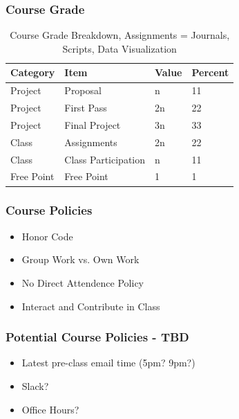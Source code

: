 \documentclass[14pt]{beamer}
\begin{document}
\begin{frame}
\frametitle{Course Grade}
\begin{table}
\begin{tabular}{l l l l}
\toprule
\textbf{Category} & \textbf{Item} & \textbf{Value} & \textbf{Percent}\\
\midrule
Project & Proposal & n & 11 \\
Project & First Pass & 2n & 22 \\
Project & Final Project & 3n & 33 \\
Class & Assignments & 2n & 22 \\
Class & Class Participation & n & 11 \\
Free Point & Free Point & 1 & 1 \\
\bottomrule
\end{tabular}
\footnotesize
\caption{Course Grade Breakdown, Assignments = Journals, Scripts, Data Visualization}
\normalsize
\end{table}
\end{frame}


\begin{frame}
\frametitle{Course Policies}
\begin{itemize}
	\item<1-> Honor Code
	\item<2-> Group Work vs. Own Work
	\item<3-> No Direct Attendence Policy
	\item<4-> Interact and Contribute in Class
\end{itemize}


\end{frame}
\begin{frame}
\frametitle{Potential Course Policies - TBD}
\begin{itemize}
\item<1-> Latest pre-class email time (5pm? 9pm?)
\item<2-> Slack?
\item<3-> Office Hours?
\end{itemize}
%
\end{frame}
\end{document}
